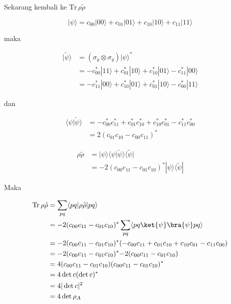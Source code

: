 Sekarang kembali ke $\mathrm{Tr}\,\rho \tilde{\rho}$

\begin{equation}
	|\psi\rangle
	= c_{00}|00\rangle + c_{01}|01\rangle
	+ c_{10}|10\rangle + c_{11}|11\rangle
\end{equation}

maka

\begin{equation}
	\begin{aligned}
		|\tilde{\psi}\rangle
		&= (\sigma_y \otimes \sigma_y)|\psi\rangle^{*}\\
		&= -c^{*}_{00}|11\rangle
		+ c^{*}_{01}|10\rangle
		+ c^{*}_{10}|01\rangle
		- c^{*}_{11}|00\rangle\\
		&= -c^{*}_{11}|00\rangle
		+ c^{*}_{10}|01\rangle
		+ c^{*}_{01}|10\rangle
		- c^{*}_{00}|11\rangle
	\end{aligned}
\end{equation}

dan

\begin{equation}
	\begin{aligned}
		\langle \psi | \tilde{\psi} \rangle
		&= -c^{*}_{00} c^{*}_{11}
		+ c^{*}_{01} c^{*}_{10}
		+ c^{*}_{10} c^{*}_{01}
		- c^{*}_{11} c^{*}_{00}\\
		&= 2 (c_{01} c_{10} - c_{00} c_{11})^{*}
	\end{aligned}
\end{equation}

\begin{equation}
	\begin{aligned}
		\rho \tilde{\rho}
		&= |\psi\rangle \langle\psi| \tilde{\psi}\rangle \langle\tilde{\psi}|\\
		&= -2 (c_{00} c_{11} - c_{01} c_{10})^{*}
		|\psi\rangle \langle\tilde{\psi}|
	\end{aligned}
\end{equation}

Maka

\begin{equation}
	\begin{aligned}
		\mathrm{Tr}\,\rho \tilde{\rho}
		&= \sum_{p q} \langle p q | \rho \tilde{\rho} | p q \rangle\\
		&= -2(c_{00}c_{11}-c_{01}c_{10})^{*} \sum_{p q} \langle p q \ket{\psi}\bra{\psi} p q \rangle\\
		&=-2(c_{00} c_{11} - c_{01} c_{10})^{*}(-c_{00}c_{11}+c_{01}c_{10}+c_{10}c_{01}-c_{11}c_{00})\\
		&=-2(c_{00} c_{11} - c_{01} c_{10})^{*} {-2(c_{00} c_{11} - c_{01} c_{10})}\\
		&= 4 (c_{00} c_{11} - c_{01} c_{10})
		(c_{00} c_{11} - c_{01} c_{10})^{*}\\
		&= 4 \det c (\det c)^{*}\\
		&= 4 |\det c|^2\\
		&= 4 \det \rho_A
	\end{aligned}
\end{equation}

